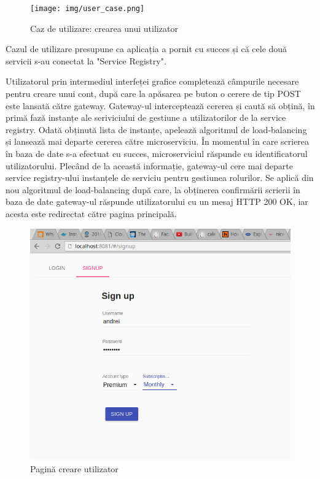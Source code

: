 \documentclass[12pt, a4paper, oneside, romanian]{teza-upb}
\begin{document}
\begin{figure}[ht]
\centering
\texttt{[image: img/user\_case.png]}
\caption{Caz de utilizare: crearea unui utilizator}
\label{fig:arhi_componente}
\end{figure}

Cazul de utilizare presupune ca aplicația a pornit cu succes și că cele două servicii s-au conectat la "Service Registry". 


Utilizatorul prin intermediul interfeței grafice completează câmpurile necesare pentru creare unui cont, după care la apăsarea pe buton o cerere de tip POST este lansată către gateway. Gateway-ul interceptează cererea și caută să obțină, în primă fază instanțe ale seriviciului de gestiune a utilizatorilor de la service registry. Odată obținută lista de instanțe, apelează algoritmul de load-balancing și lansează mai departe cererea către microserviciu. În momentul în care scrierea în baza de date s-a efectuat cu succes, microserviciul răspunde cu identificatorul utilizatorului. Plecând de la această informație, gateway-ul cere mai departe service registry-ului instanțele de serviciu pentru gestiunea rolurilor. Se aplică din nou algoritmul de load-balancing după care, la obținerea confirmării scrierii în baza de date gateway-ul răspunde utilizatorului cu un mesaj HTTP 200 OK, iar acesta este redirectat către pagina principală. 


\begin{figure}[ht]
\centering
\includegraphics[scale=0.5]{img/login_screen.png}
\caption{Pagină creare utilizator}
\label{fig:arhi_componente}
\end{figure}
\end{document}
